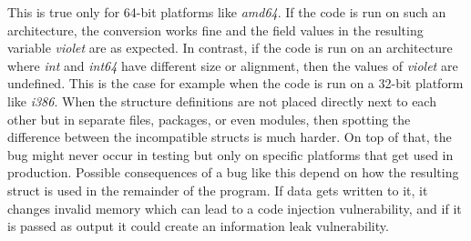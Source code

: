 This is true only for 64-bit platforms like \textit{amd64}.
If the code is run on such an architecture, the conversion works fine and the field values in the resulting variable
\textit{violet} are as expected.
In contrast, if the code is run on an architecture where \textit{int} and \textit{int64} have different size or
alignment, then the values of \textit{violet} are undefined.
This is the case for example when the code is run on a 32-bit platform like \textit{i386}.
When the structure definitions are not placed directly next to each other but in separate files, packages, or even
modules, then spotting the difference between the incompatible structs is much harder.
On top of that, the bug might never occur in testing but only on specific platforms that get used in production.
Possible consequences of a bug like this depend on how the resulting struct is used in the remainder of the program.
If data gets written to it, it changes invalid memory which can lead to a code injection vulnerability, and if it is
passed as output it could create an information leak vulnerability.
